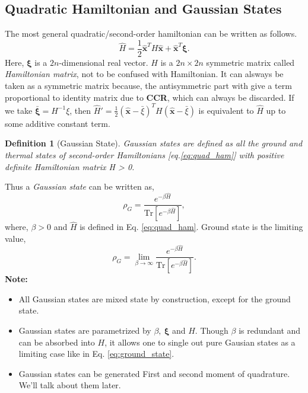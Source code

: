 \documentclass[english,10pt,a4paper]{article}
\newtheorem{definition}{Definition}
\newcommand{\xx}{\hat{\textbf{x}}}
\newcommand{\ham}{\hat H}
\newcommand{\half}{\frac{1}{2}}
\newcommand{\tr}[1]{\text{Tr}\left[{#1}\right]}
\begin{document}
	\subsection{Quadratic Hamiltonian and Gaussian States}
	The most general quadratic/second-order hamiltonian can be written as follows.
	\begin{equation}
		\label{eq:quad_ham}
		\ham = \half \xx^T H \xx + \xx^T \mathbf{\xi}.
	\end{equation}
	Here, $\mathbf{\xi}$ is a $2n$-dimensional real vector. $H$ is a $2n\times 2n$ symmetric matrix called \textit{Hamiltonian matrix}, not to be confused with Hamiltonian. It can alsways be taken as  a symmetric matrix because, the antisymmetric part with give a term proportional to identity matrix due to \textbf{CCR}, which can always be discarded. If we take $\bar{\mathbf{\xi}}=H^{-1}\xi$, then $\hat{H}' = \half (\xx-\bar{\xi})^T H (\xx-\bar{\xi})$ is equivalent to $\hat{H}$ up to some additive constant term.
	\begin{definition}[Gaussian State]
		Gaussian states are defined as all the ground and thermal states of second-order Hamiltonians [eq.\ref{eq:quad_ham}] with positive definite Hamiltonian matrix H > 0.
	\end{definition}
	Thus a \textit{Gaussian state} can be written as,
	\begin{equation}
		\label{eq:gaussian_state}
		\rho_G = \frac{e^{-\beta \hat{H}}}{\tr{e^{-\beta \hat{H}}}},
	\end{equation}
	where, $\beta >0$ and $\hat{H}$ is defined in Eq. \ref{eq:quad_ham}. Ground state is the limiting value,
	\begin{equation}
		\label{eq:ground_state}
		\rho_G = \lim_{\beta\to \infty} \frac{e^{-\beta \hat{H}}}{\tr{e^{-\beta \hat{H}}}}.
	\end{equation}
	\textbf{Note:}
	\begin{itemize}
		\item All Gaussian states are mixed state by construction, except for the ground state.
		\item Gaussian states are parametrized by $\beta,\ \mathbf{\xi}$ and $H$. Though $\beta$ is redundant and can be absorbed into $H$, it allows one to single out pure Gausian states as a limiting case like in Eq. \ref{eq:ground_state}. 
		\item Gaussian states can be generated First and second moment of quadrature. We'll talk about them later.
	\end{itemize}
	
	
	
\end{document}
